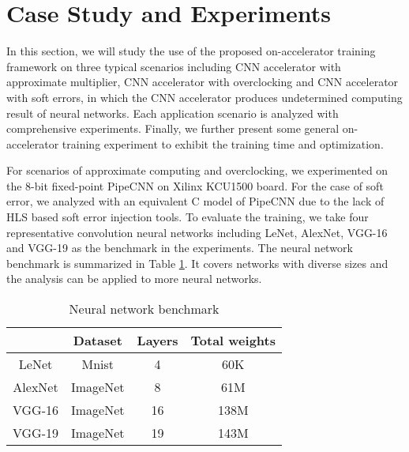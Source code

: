 \section{Case Study and Experiments} \label{sec:casestudy}
In this section, we will study the use of the proposed on-accelerator training framework 
on three typical scenarios including CNN accelerator with approximate multiplier, 
CNN accelerator with overclocking and CNN accelerator with soft errors, 
in which the CNN accelerator produces undetermined computing result of neural networks.
Each application scenario is analyzed with comprehensive experiments. 
Finally, we further present some general on-accelerator training experiment to 
exhibit the training time and optimization.

For scenarios of approximate computing and overclocking, we experimented on the 8-bit 
fixed-point PipeCNN \cite{pipecnn_2} on Xilinx KCU1500 board. For the case of soft error, 
we analyzed with an equivalent C model of PipeCNN due to the lack of 
HLS based soft error injection tools. To evaluate the training, 
we take four representative convolution neural networks including LeNet, 
AlexNet, VGG-16 and VGG-19 as the benchmark in the experiments. The neural network 
benchmark is summarized in Table \ref{tab:CNN-table}. It covers networks with 
diverse sizes and the analysis can be applied to more neural networks.

\begin{table}
        \centering
        \vspace{-0.3em}
        \caption{Neural network benchmark}
        \label{tab:CNN-table}
        \vspace{-0.3em}
        \begin{tabular}{c|c|c|c}
		\toprule
		  & Dataset & Layers & Total weights \\
		\midrule
		LeNet & Mnist & 4 & 60K \\
		\midrule
		AlexNet & ImageNet & 8 & 61M \\
		\midrule
		VGG-16 & ImageNet & 16 & 138M \\
		\midrule
		VGG-19 & ImageNet & 19 & 143M \\
		\bottomrule
        \end{tabular}
        \vspace{-1em}
\end{table}


